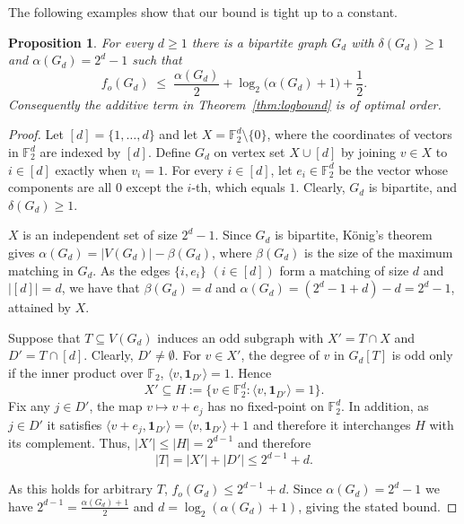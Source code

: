 \documentclass[11pt]{article}
\newcommand{\VV}[1]{{#1}}
\newtheorem{proposition}[theorem]{Proposition}
\theoremstyle{definition}
\theoremstyle{remark}
\newcommand{\1}{\mathbf{1}}
\begin{document}
	The following examples show that our bound is tight up to a constant. 
	
	\begin{proposition}\label{prop:tight}
		For every $d \ge 1$ there is a bipartite graph $G_d$ with
		$\delta(G_d) \ge 1$ and $\alpha(G_d) = 2^d - 1$ such that
		\[
		f_o(G_d) \;\le\; \frac{\alpha(G_d)}{2} + \log_2\!\bigl(\alpha(G_d) + 1\bigr) + \frac12.
		\]
		Consequently the additive term in Theorem~\ref{thm:logbound} is of optimal order.
	\end{proposition}
	
	\begin{proof}
		\VV{Let $[d] = \{1, \dots, d\}$ and let $X = \mathbb{F}_2^d \setminus \{0\}$, where the coordinates of vectors in $\mathbb{F}_2^d$ are indexed by $[d]$.} Define $G_d$ on vertex set
		$X \cup [d]$ by joining $v \in X$ to $i \in [d]$ exactly when $v_i = 1$. For every $i\in [d]$, let $e_i\in \mathbb{F}_2^d$ be \VV{the vector whose components are all $0$ except the $i$-th, which equals $1$}. Clearly, $G_d$ is bipartite, and $\delta(G_d) \ge 1$.
		
		\VV{$X$ is an independent set of size $2^d - 1$.} Since $G_d$ is bipartite, König's theorem gives $\alpha(G_d) = |V(G_d)| - \beta(G_d)$, where $\beta(G_d)$ is the size of the maximum matching in $G_d$. As the edges $\{i, e_i\}$ $(i \in [d])$ form a matching of size $d$ and $|[d]|=d$, we have that $\beta(G_d) = d$ and
		$\alpha(G_d) = (2^d - 1 + d) - d = 2^d - 1$, attained by $X$.
		
		Suppose that $T \subseteq V(G_d)$ induces an odd subgraph with $X' = T \cap X$ and $D' = T \cap [d]$. Clearly, $D' \ne \emptyset$. For $v \in X'$, the degree of $v$ in $G_d[T]$ is odd only if the inner product over $\mathbb{F}_2$, $\langle v, \mathbf{1}_{D'} \rangle=1$.  Hence
		\[
		X' \subseteq H := \{v \in \mathbb{F}_2^d :
		\langle v, \mathbf{1}_{D'} \rangle = 1\}.
		\]
		Fix any $j \in D'$, the map $v \mapsto v + e_j$ has no fixed-point
		on $\mathbb{F}_2^d$. In addition, as $j \in D'$ it satisfies
		$\langle v + e_j, \mathbf{1}_{D'}\rangle = \langle v, \mathbf{1}_{D'}\rangle + 1$ and therefore it interchanges $H$ with its complement. Thus, $|X'|\leq |H| = 2^{d-1}$ and therefore
		\[
		|T| = |X'| + |D'| \le 2^{d-1} + d .
		\]
		
		As this holds for arbitrary $T$, $f_o(G_d) \le 2^{d-1} + d$. Since $\alpha(G_d) = 2^d - 1$ we have $2^{d-1} = \tfrac{\alpha(G_d)+1}{2}$ and
		$d = \log_2(\alpha(G_d) + 1)$, giving the stated bound. 
	\end{proof}
	
\end{document}

